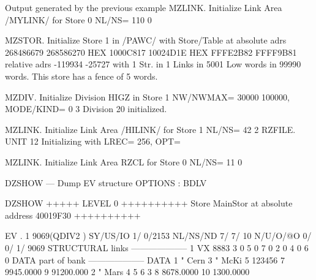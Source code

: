 \begin{landscapebody}
\begin{XMPt}{Output generated by the previous example}
MZLINK.  Initialize Link Area  /MYLINK/  for Store  0 NL/NS=   110     0

MZSTOR.  Initialize Store  1  in /PAWC/  
         with Store/Table at absolute adrs   268486679   268586270
                                       HEX    1000C817    10024D1E
                                       HEX    FFFE2B82    FFFF9B81
                             relative adrs     -119934      -25727
         with     1 Str. in     1 Links in   5001 Low words in   99990 words.
         This store has a fence of    5 words.

MZDIV.   Initialize Division  HIGZ      in Store  1
         NW/NWMAX=  30000 100000,  MODE/KIND=  0  3
         Division 20 initialized.

MZLINK.  Initialize Link Area  /HILINK/  for Store  1 NL/NS=    42     2
RZFILE. UNIT     12 Initializing with LREC=   256, OPT=  

MZLINK.  Initialize Link Area  RZCL      for Store  0 NL/NS=    11     0
                                                                                                                                 
DZSHOW --- Dump EV structure                                                                       OPTIONS : BDLV                
                                                                                                                                 
DZSHOW  +++++ LEVEL     0 ++++++++++            Store  MainStor at absolute address 40019F30      ++++++++++                     
                                                                                                                                 
 EV  .     1     9069(QDIV2   ) SY/US/IO    1/    0/2153 NL/NS/ND    7/    7/      10 N/U/O/@O       0/       0/       1/    9069
STRUCTURAL links                                          --------------------                                                   
          1    VX        8883     3                 0     5                 0     7                 0                            
          2                 0     4                 0     6                 0                                                    
DATA part of bank                                         --------------------                                                   
DATA      1     "        Cern     3     "        McKi     5            123456     7     9945.0000         9     91200.000        
          2     "        Mars     4                 5     6                 3     8     8678.0000        10     1300.0000        
                                                                                                                                 

\end{XMPt}
\end{landscapebody}
